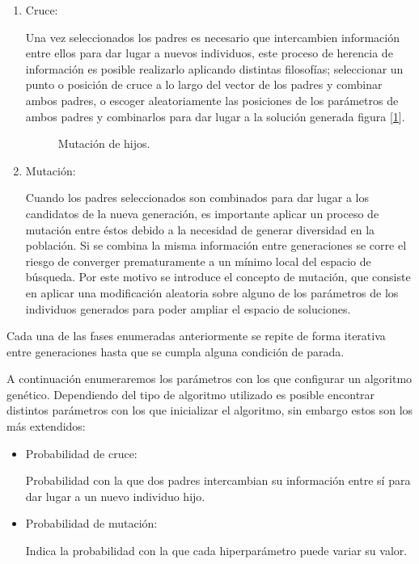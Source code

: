 \begin{enumerate}
                \item Cruce:

                        Una vez seleccionados los padres es necesario que intercambien información entre ellos para dar lugar a nuevos individuos, este proceso de herencia de información es posible realizarlo aplicando distintas filosofías; seleccionar un punto o posición de cruce a lo largo del vector de los padres y combinar ambos padres, o escoger aleatoriamente las posiciones de los parámetros de ambos padres y combinarlos para dar lugar a la solución generada figura [\ref{ParentsMatingMutationImage}].

                        \begin{figure}[h]
                            \centering
                            
                            \caption{Mutación de hijos.}
                            \label{ParentsMatingMutationImage}
                        \end{figure}

                \item Mutación:

                        Cuando los padres seleccionados son combinados para dar lugar a los candidatos de la nueva generación, es importante aplicar un proceso de mutación entre éstos debido a la necesidad de generar diversidad en la población. Si se combina la misma información entre generaciones se corre el riesgo de converger prematuramente a un mínimo local del espacio de búsqueda. Por este motivo se introduce el concepto de mutación, que consiste en aplicar una modificación aleatoria sobre alguno de los parámetros de los individuos generados para poder ampliar el espacio de soluciones. 
            \end{enumerate}

            Cada una de las fases enumeradas anteriormente se repite de forma iterativa entre generaciones hasta que se cumpla alguna condición de parada.


            A continuación enumeraremos los parámetros con los que configurar un algoritmo genético. Dependiendo del tipo de algoritmo utilizado es posible encontrar distintos parámetros con los que inicializar el algoritmo, sin embargo estos son los más extendidos:


            \begin{itemize}


                \item Probabilidad de cruce:

                Probabilidad con la que dos padres intercambian su información entre sí para dar lugar a un nuevo individuo hijo.

                \item Probabilidad de mutación:

                Indica la probabilidad con la que cada hiperparámetro puede variar su valor.

            \end{itemize}


